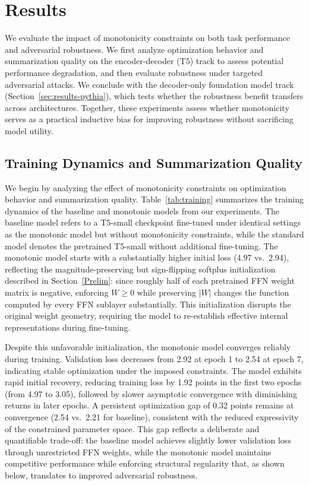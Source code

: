 \documentclass{article}
\theoremstyle{plain}
\theoremstyle{definition}
\theoremstyle{remark}
\begin{document}
\section{Results}
\label{sec:results}
We evaluate the impact of monotonicity constraints on both task performance and adversarial robustness. We first analyze optimization behavior and summarization quality on the encoder-decoder (T5) track to assess potential performance degradation, and then evaluate robustness under targeted adversarial attacks. We conclude with the decoder-only foundation model track (Section~\ref{sec:results-pythia}), which tests whether the robustness benefit transfers across architectures. Together, these experiments assess whether monotonicity serves as a practical inductive bias for improving robustness without sacrificing model utility.


\subsection{Training Dynamics and Summarization Quality}

We begin by analyzing the effect of monotonicity constraints on optimization behavior and summarization quality. Table~\ref{tab:training} summarizes the training dynamics of the baseline and monotonic models from our experiments. The baseline model refers to a T5-small checkpoint fine-tuned under identical settings as the monotonic model but without monotonicity constraints, while the standard model denotes the pretrained T5-small without additional fine-tuning. The monotonic model starts with a substantially higher initial loss (4.97 vs.\ 2.94), reflecting the magnitude-preserving but sign-flipping softplus initialization described in Section~\ref{Prelim}: since roughly half of each pretrained FFN weight matrix is negative, enforcing $W\ge 0$ while preserving $|W|$ changes the function computed by every FFN sublayer substantially. This initialization disrupts the original weight geometry, requiring the model to re-establish effective internal representations during fine-tuning.

Despite this unfavorable initialization, the monotonic model converges reliably during training. Validation loss decreases from 2.92 at epoch 1 to 2.54 at epoch 7, indicating stable optimization under the imposed constraints. The model exhibits rapid initial recovery, reducing training loss by 1.92 points in the first two epochs (from 4.97 to 3.05), followed by slower asymptotic convergence with diminishing returns in later epochs. A persistent optimization gap of 0.32 points remains at convergence (2.54 vs.\ 2.21 for baseline), consistent with the reduced expressivity of the constrained parameter space. This gap reflects a deliberate and quantifiable trade-off: the baseline model achieves slightly lower validation loss through unrestricted FFN weights, while the monotonic model maintains competitive performance while enforcing structural regularity that, as shown below, translates to improved adversarial robustness.
\end{document}
